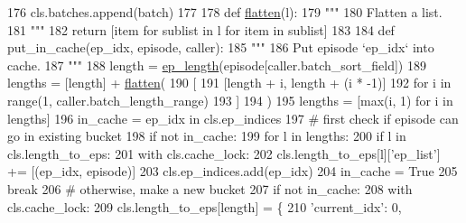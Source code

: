 \begin{DoxyCode}
176                             cls.batches.append(batch)
177 
178         \textcolor{keyword}{def }\hyperlink{namespaceprojects_1_1controllable__dialogue_1_1controllable__seq2seq_1_1controls_a0db4b9d9584cef90aa2515a75e741774}{flatten}(l):
179             \textcolor{stringliteral}{"""}
180 \textcolor{stringliteral}{            Flatten a list.}
181 \textcolor{stringliteral}{            """}
182             \textcolor{keywordflow}{return} [item \textcolor{keywordflow}{for} sublist \textcolor{keywordflow}{in} l \textcolor{keywordflow}{for} item \textcolor{keywordflow}{in} sublist]
183 
184         \textcolor{keyword}{def }put\_in\_cache(ep\_idx, episode, caller):
185             \textcolor{stringliteral}{"""}
186 \textcolor{stringliteral}{            Put episode `ep\_idx` into cache.}
187 \textcolor{stringliteral}{            """}
188             length = \hyperlink{namespaceparlai_1_1core_1_1pytorch__data__teacher_afbd22acd239efcdb6afb94db83ee3493}{ep\_length}(episode[caller.batch\_sort\_field])
189             lengths = [length] + \hyperlink{namespaceprojects_1_1controllable__dialogue_1_1controllable__seq2seq_1_1controls_a0db4b9d9584cef90aa2515a75e741774}{flatten}(
190                 [
191                     [length + i, length + (i * -1)]
192                     \textcolor{keywordflow}{for} i \textcolor{keywordflow}{in} range(1, caller.batch\_length\_range)
193                 ]
194             )
195             lengths = [max(i, 1) \textcolor{keywordflow}{for} i \textcolor{keywordflow}{in} lengths]
196             in\_cache = ep\_idx \textcolor{keywordflow}{in} cls.ep\_indices
197             \textcolor{comment}{# first check if episode can go in existing bucket}
198             \textcolor{keywordflow}{if} \textcolor{keywordflow}{not} in\_cache:
199                 \textcolor{keywordflow}{for} l \textcolor{keywordflow}{in} lengths:
200                     \textcolor{keywordflow}{if} l \textcolor{keywordflow}{in} cls.length\_to\_eps:
201                         with cls.cache\_lock:
202                             cls.length\_to\_eps[l][\textcolor{stringliteral}{'ep\_list'}] += [(ep\_idx, episode)]
203                             cls.ep\_indices.add(ep\_idx)
204                         in\_cache = \textcolor{keyword}{True}
205                         \textcolor{keywordflow}{break}
206             \textcolor{comment}{# otherwise, make a new bucket}
207             \textcolor{keywordflow}{if} \textcolor{keywordflow}{not} in\_cache:
208                 with cls.cache\_lock:
209                     cls.length\_to\_eps[length] = \{
210                         \textcolor{stringliteral}{'current\_idx'}: 0,

\end{DoxyCode}
